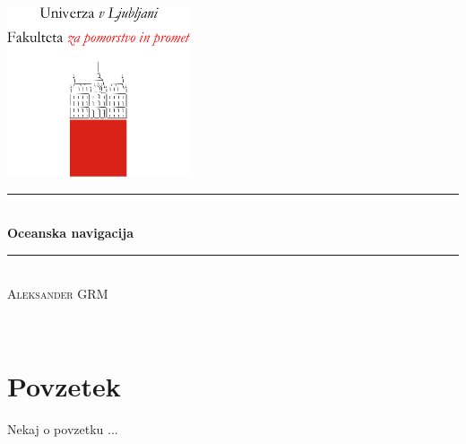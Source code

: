 \documentclass[11pt,twosided]{book}
\theoremstyle{definition}
\begin{document}
\pagestyle{empty}

    \begin{center}
	    \includegraphics[height=5cm]{logo/fpp_logo_vertical_slo_red.pdf}\\[3cm]
	    
		\rule{\linewidth}{1 mm} \\[7mm]
		{ \huge \bfseries Oceanska navigacija}\\[4mm]
		\rule{\linewidth}{1 mm} \\[3cm]
		
		{\large \textsc{Aleksander GRM} }
		
	\end{center}

\clearpage
~
\newpage
\pagestyle{plain}
\setcounter{page}{1}

\tableofcontents

\newpage
\chapter*{Povzetek}

Nekaj o povzetku ...
\clearpage
~
\newpage
\pagestyle{fancy}
\setcounter{page}{1}



\newpage


\newpage


\newpage


\newpage



\newpage



\end{document}
